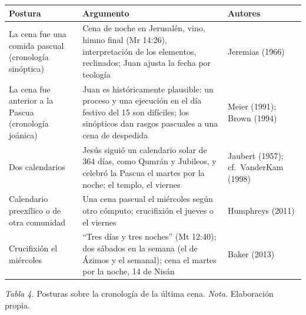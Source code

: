 \documentclass[11pt,letterpaper]{article}
\begin{document}
\begin{table}[!htbp]\centering\small\renewcommand{\arraystretch}{1.2}
\begin{tabular}{@{}L{3.6cm}L{6.2cm}L{4.6cm}@{}}
\toprule
\textbf{Postura} & \textbf{Argumento} & \textbf{Autores} \\ \midrule
La cena fue una comida pascual (cronología sinóptica) & Cena de noche en Jerusalén, vino, himno final (Mr 14:26), interpretación de los elementos, reclinados; Juan ajusta la fecha por teología & Jeremias (1966) \\
La cena fue anterior a la Pascua (cronología joánica) & Juan es históricamente plausible: un proceso y una ejecución en el día festivo del 15 son difíciles; los sinópticos dan rasgos pascuales a una cena de despedida & Meier (1991); Brown (1994) \\
Dos calendarios & Jesús siguió un calendario solar de 364 días, como Qumrán y Jubileos, y celebró la Pascua el martes por la noche; el templo, el viernes & Jaubert (1957); cf.\ VanderKam (1998) \\
Calendario preexílico o de otra comunidad & Una cena pascual el miércoles según otro cómputo; crucifixión el jueves o el viernes & Humphreys (2011) \\
Crucifixión el miércoles & ``Tres días y tres noches'' (Mt 12:40); dos sábados en la semana (el de Ázimos y el semanal); cena el martes por la noche, 14 de Nisán & Baker (2013) \\
\bottomrule
\end{tabular}\par
{\footnotesize\color{sepia}\textit{Tabla 4.} Posturas sobre la cronología de la última cena. \textit{Nota.} Elaboración propia.}
\end{table}
\end{document}
